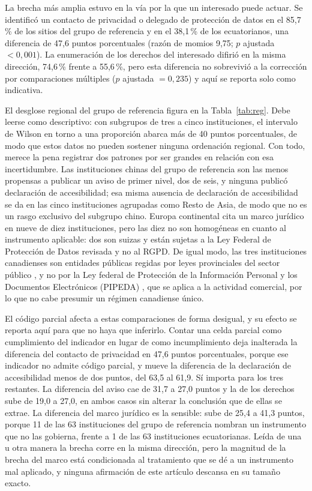 \documentclass[pdflatex,sn-basic,Numbered,iicol]{sn-jnl}
\theoremstyle{thmstyleone}
\theoremstyle{thmstyletwo}
\theoremstyle{thmstylethree}
\begin{document}
La brecha m\'as amplia estuvo en la v\'ia por la que un interesado puede actuar. Se identific\'o un contacto de privacidad o delegado de protecci\'on de datos en el 85,7\,\% de los sitios del grupo de referencia y en el 38,1\,\% de los ecuatorianos, una diferencia de 47,6 puntos porcentuales (raz\'on de momios 9,75; $p$ ajustada $<0{,}001$). La enumeraci\'on de los derechos del interesado difiri\'o en la misma direcci\'on, 74,6\,\% frente a 55,6\,\%, pero esta diferencia no sobrevivi\'o a la correcci\'on por comparaciones m\'ultiples ($p$ ajustada $=0{,}235$) y aqu\'i se reporta solo como indicativa.

El desglose regional del grupo de referencia figura en la Tabla~\ref{tab:reg}. Debe leerse como descriptivo: con subgrupos de tres a cinco instituciones, el intervalo de Wilson en torno a una proporci\'on abarca m\'as de 40 puntos porcentuales, de modo que estos datos no pueden sostener ninguna ordenaci\'on regional. Con todo, merece la pena registrar dos patrones por ser grandes en relaci\'on con esa incertidumbre. Las instituciones chinas del grupo de referencia son las menos propensas a publicar un aviso de primer nivel, dos de seis, y ninguna public\'o declaraci\'on de accesibilidad; esa misma ausencia de declaraci\'on de accesibilidad se da en las cinco instituciones agrupadas como Resto de Asia, de modo que no es un rasgo exclusivo del subgrupo chino. Europa continental cita un marco jur\'idico en nueve de diez instituciones, pero las diez no son homog\'eneas en cuanto al instrumento aplicable: dos son suizas y est\'an sujetas a la Ley Federal de Protecci\'on de Datos revisada \citep{fadp_ch} y no al RGPD. De igual modo, las tres instituciones canadienses son entidades p\'ublicas regidas por leyes provinciales del sector p\'ublico \citep{fippa_on,fippa_bc,quebec_privacy}, y no por la Ley federal de Protecci\'on de la Informaci\'on Personal y los Documentos Electr\'onicos (PIPEDA) \citep{pipeda2000}, que se aplica a la actividad comercial, por lo que no cabe presumir un r\'egimen canadiense \'unico.

El c\'odigo parcial afecta a estas comparaciones de forma desigual, y su efecto se reporta aqu\'i para que no haya que inferirlo. Contar una celda parcial como cumplimiento del indicador en lugar de como incumplimiento deja inalterada la diferencia del contacto de privacidad en 47,6 puntos porcentuales, porque ese indicador no admite c\'odigo parcial, y mueve la diferencia de la declaraci\'on de accesibilidad menos de dos puntos, del 63,5 al 61,9. S\'i importa para los tres restantes. La diferencia del aviso cae de 31,7 a 27,0 puntos y la de los derechos sube de 19,0 a 27,0, en ambos casos sin alterar la conclusi\'on que de ellas se extrae. La diferencia del marco jur\'idico es la sensible: sube de 25,4 a 41,3 puntos, porque 11 de las 63 instituciones del grupo de referencia nombran un instrumento que no las gobierna, frente a 1 de las 63 instituciones ecuatorianas. Le\'ida de una u otra manera la brecha corre en la misma direcci\'on, pero la magnitud de la brecha del marco est\'a condicionada al tratamiento que se d\'e a un instrumento mal aplicado, y ninguna afirmaci\'on de este art\'iculo descansa en su tama\~no exacto.
\end{document}
